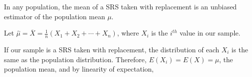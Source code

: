 \begin{thm} In any population, the mean of a SRS taken with replacement is an unbiased estimator of the population mean $\mu$.
\end{thm}
\begin{pf} Let $\widehat{\mu} = \overline{X} = \frac{1}{n}(X_1 + X_2 + \cdots + X_n)$, where $X_i$ is the $i^{th}$ value in our sample.
\par
\noindent If our sample is a SRS taken with replacement, the distribution of each $X_i$ is the same as the population distribution. Therefore, $E(X_i) = E(X) = \mu$, the population mean, and by linearity of expectation,
\end{pf}

